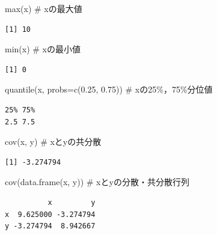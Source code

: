 \documentclass[
  letterpaper,
  DIV=11,
  numbers=noendperiod]{scrreprt}
\newenvironment{Shaded}{\begin{snugshade}}{\end{snugshade}}
\newcommand{\AttributeTok}[1]{\textcolor[rgb]{0.40,0.45,0.13}{#1}}
\newcommand{\CommentTok}[1]{\textcolor[rgb]{0.37,0.37,0.37}{#1}}
\newcommand{\FloatTok}[1]{\textcolor[rgb]{0.68,0.00,0.00}{#1}}
\newcommand{\FunctionTok}[1]{\textcolor[rgb]{0.28,0.35,0.67}{#1}}
\newcommand{\NormalTok}[1]{\textcolor[rgb]{0.00,0.23,0.31}{#1}}
\begin{document}
\begin{Shaded}
\begin{Highlighting}[]
\FunctionTok{max}\NormalTok{(x) }\CommentTok{\# xの最大値}
\end{Highlighting}
\end{Shaded}

\begin{verbatim}
[1] 10
\end{verbatim}

\begin{Shaded}
\begin{Highlighting}[]
\FunctionTok{min}\NormalTok{(x) }\CommentTok{\# xの最小値}
\end{Highlighting}
\end{Shaded}

\begin{verbatim}
[1] 0
\end{verbatim}

\begin{Shaded}
\begin{Highlighting}[]
\FunctionTok{quantile}\NormalTok{(x, }\AttributeTok{probs=}\FunctionTok{c}\NormalTok{(}\FloatTok{0.25}\NormalTok{, }\FloatTok{0.75}\NormalTok{)) }\CommentTok{\# xの25\%，75\%分位値}
\end{Highlighting}
\end{Shaded}

\begin{verbatim}
25% 75% 
2.5 7.5 
\end{verbatim}

\begin{Shaded}
\begin{Highlighting}[]
\FunctionTok{cov}\NormalTok{(x, y) }\CommentTok{\# xとyの共分散}
\end{Highlighting}
\end{Shaded}

\begin{verbatim}
[1] -3.274794
\end{verbatim}

\begin{Shaded}
\begin{Highlighting}[]
\FunctionTok{cov}\NormalTok{(}\FunctionTok{data.frame}\NormalTok{(x, y)) }\CommentTok{\# xとyの分散・共分散行列}
\end{Highlighting}
\end{Shaded}

\begin{verbatim}
          x         y
x  9.625000 -3.274794
y -3.274794  8.942667
\end{verbatim}
\end{document}
